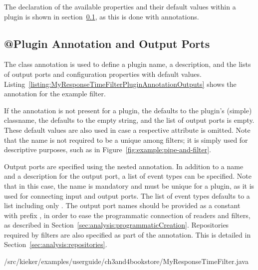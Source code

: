 \noindent The declaration of the available properties and their default values within a plugin is shown in section~\ref{sec:analysis:pluginAnnotation}, as this is done with annotations.


\subsection{@Plugin Annotation and Output Ports}\label{sec:analysis:pluginAnnotation}

\noindent The  class annotation is used to define a %
plugin name, a description, and the lists of output ports and configuration %
properties with default values. %
Listing~\ref{listing:MyResponseTimeFilterPluginAnnotationOutputs} shows the %
 annotation for the example filter.

\enlargethispage{1cm}

If the  annotation is not present for a plugin, the  %
defaults to the plugin's (simple) classname, the  defaults %
to the empty string, and the list of output ports is empty. These default values %
are also used in case a respective attribute is omitted. %
Note that the name is not required to be a unique among filters; it is simply %
used for descriptive purposes, such as in Figure~\ref{fig:example:pipe-and-filter}. %

Output ports are specified using the nested  annotation. %
In addition to a name and a description for the output port, a list of event %
types can be specified. Note that in this case, the name is mandatory and must %
be unique for a plugin, as it is used for connecting input and output ports. %
The list of event types defaults to a list including only . %
The output port names should be provided as a  constant %
with prefix , in order to ease the programmatic %
connection of readers and filters, as described in %
Section~\ref{sec:analysis:programmaticCreation}. Repositories required by %
filters are also specified as part of the  annotation. %
This is detailed in Section~\ref{sec:analysis:repositories}. %

\setJavaCodeListing
%
{\customComponentsBookstoreApplicationDir/src/kieker/examples/userguide/ch3and4bookstore/MyResponseTimeFilter.java}

